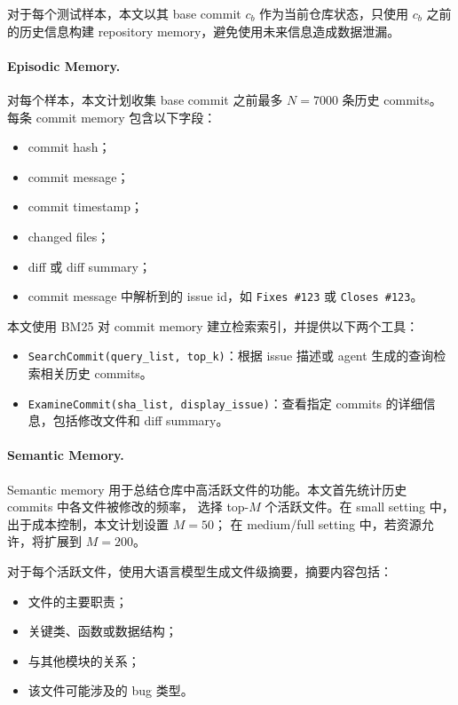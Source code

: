 \documentclass[11pt]{article}
\begin{document}
对于每个测试样本，本文以其 base commit $c_b$ 作为当前仓库状态，只使用
$c_b$ 之前的历史信息构建 repository memory，避免使用未来信息造成数据泄漏。

\paragraph{Episodic Memory.}
对每个样本，本文计划收集 base commit 之前最多 $N=7000$ 条历史 commits。
每条 commit memory 包含以下字段：

\begin{itemize}
    \item commit hash；
    \item commit message；
    \item commit timestamp；
    \item changed files；
    \item diff 或 diff summary；
    \item commit message 中解析到的 issue id，如 \texttt{Fixes \#123} 或 \texttt{Closes \#123}。
\end{itemize}

本文使用 BM25 对 commit memory 建立检索索引，并提供以下两个工具：

\begin{itemize}
    \item \texttt{SearchCommit(query\_list, top\_k)}：根据 issue 描述或 agent 生成的查询检索相关历史 commits。
    \item \texttt{ExamineCommit(sha\_list, display\_issue)}：查看指定 commits 的详细信息，包括修改文件和 diff summary。
\end{itemize}

\paragraph{Semantic Memory.}
Semantic memory 用于总结仓库中高活跃文件的功能。本文首先统计历史 commits 中各文件被修改的频率，
选择 top-$M$ 个活跃文件。在 small setting 中，出于成本控制，本文计划设置 $M=50$；
在 medium/full setting 中，若资源允许，将扩展到 $M=200$。

对于每个活跃文件，使用大语言模型生成文件级摘要，摘要内容包括：

\begin{itemize}
    \item 文件的主要职责；
    \item 关键类、函数或数据结构；
    \item 与其他模块的关系；
    \item 该文件可能涉及的 bug 类型。
\end{itemize}
\end{document}
